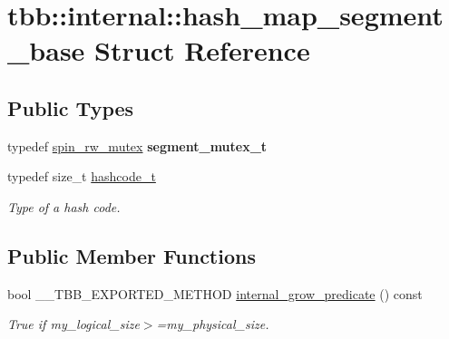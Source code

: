 \hypertarget{structtbb_1_1internal_1_1hash__map__segment__base}{}\section{tbb\+:\+:internal\+:\+:hash\+\_\+map\+\_\+segment\+\_\+base Struct Reference}
\label{structtbb_1_1internal_1_1hash__map__segment__base}
\subsection*{Public Types}
\begin{DoxyCompactItemize}
\item 
\hypertarget{structtbb_1_1internal_1_1hash__map__segment__base_a714559fc4d261c4d359c12e71610c51d}{}typedef \hyperlink{classtbb_1_1spin__rw__mutex}{spin\+\_\+rw\+\_\+mutex} {\bfseries segment\+\_\+mutex\+\_\+t}\label{structtbb_1_1internal_1_1hash__map__segment__base_a714559fc4d261c4d359c12e71610c51d}

\item 
\hypertarget{structtbb_1_1internal_1_1hash__map__segment__base_aab5635d0ca44cada2bea263ae1455134}{}typedef size\+\_\+t \hyperlink{structtbb_1_1internal_1_1hash__map__segment__base_aab5635d0ca44cada2bea263ae1455134}{hashcode\+\_\+t}\label{structtbb_1_1internal_1_1hash__map__segment__base_aab5635d0ca44cada2bea263ae1455134}

\begin{DoxyCompactList}\small\item\em Type of a hash code. \end{DoxyCompactList}\end{DoxyCompactItemize}
\subsection*{Public Member Functions}
\begin{DoxyCompactItemize}
\item 
bool \+\_\+\+\_\+\+T\+B\+B\+\_\+\+E\+X\+P\+O\+R\+T\+E\+D\+\_\+\+M\+E\+T\+H\+O\+D \hyperlink{structtbb_1_1internal_1_1hash__map__segment__base_aec229c429c7015e08a30e714eb1a6d21}{internal\+\_\+grow\+\_\+predicate} () const 
\begin{DoxyCompactList}\small\item\em True if my\+\_\+logical\+\_\+size$>$=my\+\_\+physical\+\_\+size. \end{DoxyCompactList}\end{DoxyCompactItemize}
